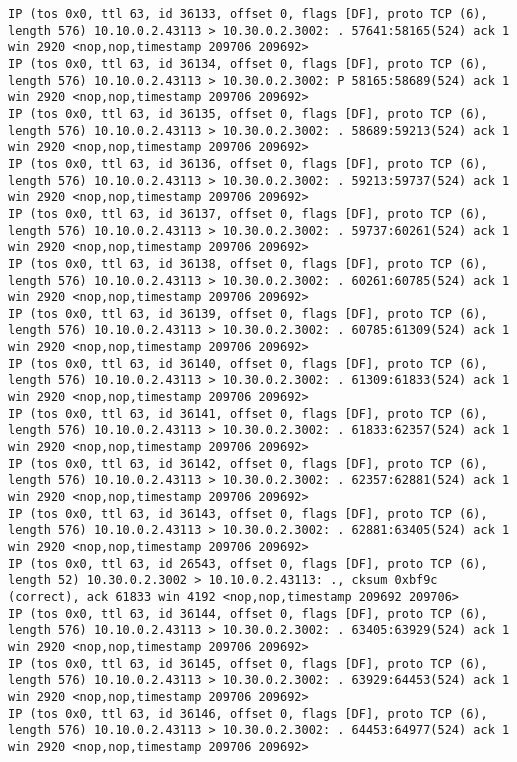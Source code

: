 \documentclass[a4paper,12pt]{article}
\begin{document}
\begin{lstlisting}
IP (tos 0x0, ttl 63, id 36133, offset 0, flags [DF], proto TCP (6), length 576) 10.10.0.2.43113 > 10.30.0.2.3002: . 57641:58165(524) ack 1 win 2920 <nop,nop,timestamp 209706 209692>
IP (tos 0x0, ttl 63, id 36134, offset 0, flags [DF], proto TCP (6), length 576) 10.10.0.2.43113 > 10.30.0.2.3002: P 58165:58689(524) ack 1 win 2920 <nop,nop,timestamp 209706 209692>
IP (tos 0x0, ttl 63, id 36135, offset 0, flags [DF], proto TCP (6), length 576) 10.10.0.2.43113 > 10.30.0.2.3002: . 58689:59213(524) ack 1 win 2920 <nop,nop,timestamp 209706 209692>
IP (tos 0x0, ttl 63, id 36136, offset 0, flags [DF], proto TCP (6), length 576) 10.10.0.2.43113 > 10.30.0.2.3002: . 59213:59737(524) ack 1 win 2920 <nop,nop,timestamp 209706 209692>
IP (tos 0x0, ttl 63, id 36137, offset 0, flags [DF], proto TCP (6), length 576) 10.10.0.2.43113 > 10.30.0.2.3002: . 59737:60261(524) ack 1 win 2920 <nop,nop,timestamp 209706 209692>
IP (tos 0x0, ttl 63, id 36138, offset 0, flags [DF], proto TCP (6), length 576) 10.10.0.2.43113 > 10.30.0.2.3002: . 60261:60785(524) ack 1 win 2920 <nop,nop,timestamp 209706 209692>
IP (tos 0x0, ttl 63, id 36139, offset 0, flags [DF], proto TCP (6), length 576) 10.10.0.2.43113 > 10.30.0.2.3002: . 60785:61309(524) ack 1 win 2920 <nop,nop,timestamp 209706 209692>
IP (tos 0x0, ttl 63, id 36140, offset 0, flags [DF], proto TCP (6), length 576) 10.10.0.2.43113 > 10.30.0.2.3002: . 61309:61833(524) ack 1 win 2920 <nop,nop,timestamp 209706 209692>
IP (tos 0x0, ttl 63, id 36141, offset 0, flags [DF], proto TCP (6), length 576) 10.10.0.2.43113 > 10.30.0.2.3002: . 61833:62357(524) ack 1 win 2920 <nop,nop,timestamp 209706 209692>
IP (tos 0x0, ttl 63, id 36142, offset 0, flags [DF], proto TCP (6), length 576) 10.10.0.2.43113 > 10.30.0.2.3002: . 62357:62881(524) ack 1 win 2920 <nop,nop,timestamp 209706 209692>
IP (tos 0x0, ttl 63, id 36143, offset 0, flags [DF], proto TCP (6), length 576) 10.10.0.2.43113 > 10.30.0.2.3002: . 62881:63405(524) ack 1 win 2920 <nop,nop,timestamp 209706 209692>
IP (tos 0x0, ttl 63, id 26543, offset 0, flags [DF], proto TCP (6), length 52) 10.30.0.2.3002 > 10.10.0.2.43113: ., cksum 0xbf9c (correct), ack 61833 win 4192 <nop,nop,timestamp 209692 209706>
IP (tos 0x0, ttl 63, id 36144, offset 0, flags [DF], proto TCP (6), length 576) 10.10.0.2.43113 > 10.30.0.2.3002: . 63405:63929(524) ack 1 win 2920 <nop,nop,timestamp 209706 209692>
IP (tos 0x0, ttl 63, id 36145, offset 0, flags [DF], proto TCP (6), length 576) 10.10.0.2.43113 > 10.30.0.2.3002: . 63929:64453(524) ack 1 win 2920 <nop,nop,timestamp 209706 209692>
IP (tos 0x0, ttl 63, id 36146, offset 0, flags [DF], proto TCP (6), length 576) 10.10.0.2.43113 > 10.30.0.2.3002: . 64453:64977(524) ack 1 win 2920 <nop,nop,timestamp 209706 209692>

\end{lstlisting}
\end{document}
